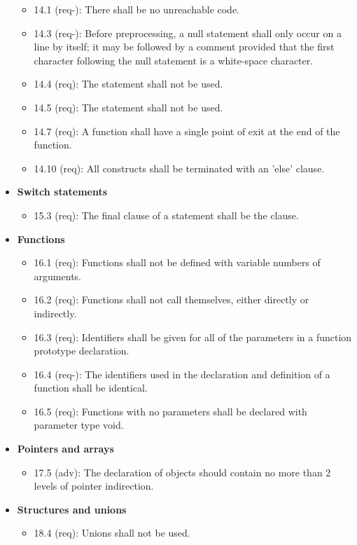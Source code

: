 \begin{itemize}
\begin{itemize}
\item 14.1 (req-): There shall be no unreachable code.
\item 14.3 (req-): Before preprocessing, a null statement shall only occur on a line by itself; it may be followed by a comment provided that the first character following the null statement is a white-space character.
\item 14.4 (req): The  statement shall not be used.
\item 14.5 (req): The  statement shall not be used.
\item 14.7 (req): A function shall have a single point of exit at the end of the function.
\item 14.10 (req): All  constructs shall be terminated with an 'else' clause.
\end{itemize}
\item \textbf{Switch statements}
\begin{itemize}
\item 15.3 (req): The final clause of a  statement shall be the 
 clause.
\end{itemize}
\item \textbf{Functions}
\begin{itemize}
\item 16.1 (req): Functions shall not be defined with variable numbers of arguments.
\item 16.2 (req): Functions shall not call themselves, either directly or indirectly.
\item 16.3 (req): Identifiers shall be given for all of the parameters in a function prototype declaration.
\item 16.4 (req-): The identifiers used in the declaration and definition of a function shall be identical.
\item 16.5 (req): Functions with no parameters shall be declared with parameter type void.
\end{itemize}
\item \textbf{Pointers and arrays}
\begin{itemize}
\item 17.5 (adv): The declaration of objects should contain no more than 2 levels of pointer indirection.
\end{itemize}
\item \textbf{Structures and unions}
\begin{itemize}
\item 18.4 (req): Unions shall not be used.

\end{itemize}
\end{itemize}

